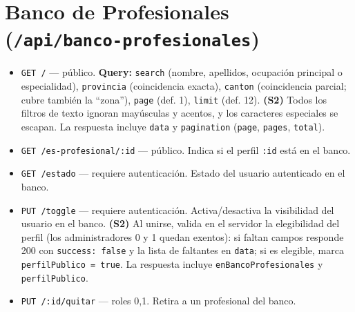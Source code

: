 \section{Banco de Profesionales (\texttt{/api/banco-profesionales})}
\begin{itemize}
    \item \texttt{GET /} — público. \textbf{Query:} \texttt{search} (nombre, apellidos, ocupación principal o especialidad), \texttt{provincia} (coincidencia exacta), \texttt{canton} (coincidencia parcial; cubre también la ``zona''), \texttt{page} (def. 1), \texttt{limit} (def. 12). \textbf{(S2)} Todos los filtros de texto ignoran mayúsculas y acentos, y los caracteres especiales se escapan. La respuesta incluye \texttt{data} y \texttt{pagination} (\texttt{page}, \texttt{pages}, \texttt{total}).
    \item \texttt{GET /es-profesional/:id} — público. Indica si el perfil \texttt{:id} está en el banco.
    \item \texttt{GET /estado} — requiere autenticación. Estado del usuario autenticado en el banco.
    \item \texttt{PUT /toggle} — requiere autenticación. Activa/desactiva la visibilidad del usuario en el banco. \textbf{(S2)} Al unirse, valida en el servidor la elegibilidad del perfil (los administradores 0 y 1 quedan exentos): si faltan campos responde 200 con \texttt{success: false} y la lista de faltantes en \texttt{data}; si es elegible, marca \texttt{perfilPublico = true}. La respuesta incluye \texttt{enBancoProfesionales} y \texttt{perfilPublico}.
    \item \texttt{PUT /:id/quitar} — roles 0,1. Retira a un profesional del banco.
\end{itemize}

